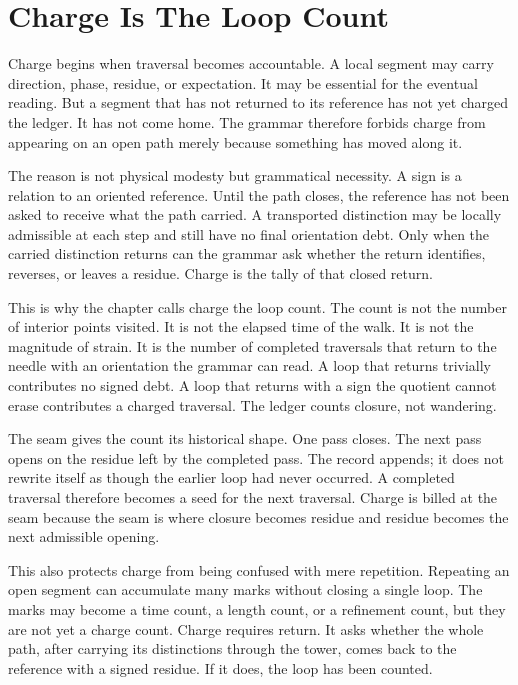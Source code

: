 \section{Charge Is The Loop Count}

Charge begins when traversal becomes accountable. A local segment may carry
direction, phase, residue, or expectation. It may be essential for the
eventual reading. But a segment that has not returned to its reference has
not yet charged the ledger. It has not come home. The grammar therefore
forbids charge from appearing on an open path merely because something has
moved along it.

The reason is not physical modesty but grammatical necessity. A sign is a
relation to an oriented reference. Until the path closes, the reference has
not been asked to receive what the path carried. A transported distinction
may be locally admissible at each step and still have no final orientation
debt. Only when the carried distinction returns can the grammar ask whether
the return identifies, reverses, or leaves a residue. Charge is the tally of
that closed return.

This is why the chapter calls charge the loop count. The count is not the
number of interior points visited. It is not the elapsed time of the walk. It
is not the magnitude of strain. It is the number of completed traversals that
return to the needle with an orientation the grammar can read. A loop that
returns trivially contributes no signed debt. A loop that returns with a sign
the quotient cannot erase contributes a charged traversal. The ledger counts
closure, not wandering.

The seam gives the count its historical shape. One pass closes. The next
pass opens on the residue left by the completed pass. The record appends; it
does not rewrite itself as though the earlier loop had never occurred. A
completed traversal therefore becomes a seed for the next traversal. Charge
is billed at the seam because the seam is where closure becomes residue and
residue becomes the next admissible opening.

This also protects charge from being confused with mere repetition. Repeating
an open segment can accumulate many marks without closing a single loop. The
marks may become a time count, a length count, or a refinement count, but
they are not yet a charge count. Charge requires return. It asks whether the
whole path, after carrying its distinctions through the tower, comes back to
the reference with a signed residue. If it does, the loop has been counted.

